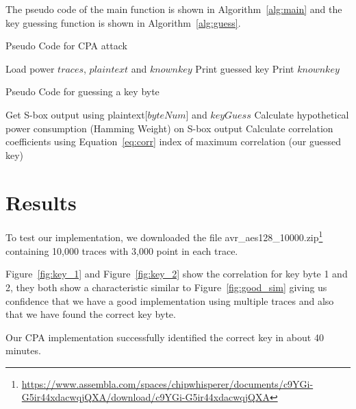 \documentclass{article}
\begin{document}
The pseudo code of the main function is shown in Algorithm~\ref{alg:main} and the key guessing function is shown in Algorithm~\ref{alg:guess}.

\begin{algorithm}[H]
  \caption{Pseudo Code for CPA attack}
  \label{alg:main}
  \begin{algorithmic}[1]
    \State Load power $traces$, $plaintext$ and $knownkey$
    \State {}
    \State Print guessed key
    \EndFor
    \State Print $knownkey$
    \EndProcedure
  \end{algorithmic}
\end{algorithm}

\begin{algorithm}[H]
  \caption{Pseudo Code for guessing a key byte}
  \label{alg:guess}
  \begin{algorithmic}[1]
    \State Get S-box output using plaintext[$byteNum$] and $keyGuess$
    \State Calculate hypothetical power consumption (Hamming Weight) on S-box output
    \EndFor
    \State Calculate correlation coefficients using Equation~\ref{eq:corr}
    \EndFor
    \EndFor
    \State\Return index of maximum correlation (our guessed key)
    \EndFunction
  \end{algorithmic}
\end{algorithm}

\section{Results}
To test our implementation, we downloaded the file avr\_aes128\_10000.zip\footnote{\url{https://www.assembla.com/spaces/chipwhisperer/documents/c9YGi-G5ir44xdacwqjQXA/download/c9YGi-G5ir44xdacwqjQXA}} containing 10,000 traces with 3,000 point in each trace.

Figure~\ref{fig:key_1} and Figure~\ref{fig:key_2} show the correlation for key byte 1 and 2, they both show a characteristic similar to Figure~\ref{fig:good_sim} giving us confidence that we have a good implementation using multiple traces and also that we have found the correct key byte.

Our CPA implementation successfully identified the correct key in about 40 minutes.
\end{document}
